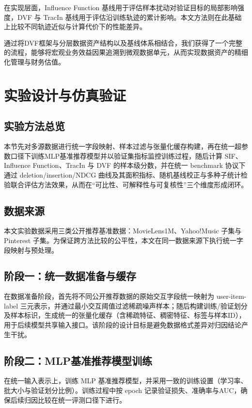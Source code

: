 \documentclass[12pt,a4paper]{ctexart}
\theoremstyle{definition}
\theoremstyle{plain}
\begin{document}
在实现层面，Influence Function 基线用于评估样本扰动对验证目标的局部影响强度，DVF 与 TracIn 基线用于评估沿训练轨迹的累计影响。本文方法则在此基础上比较不同轨迹近似与计算代价下的性能差异。

通过将DVF框架与分层数据资产结构以及基线体系相结合，我们获得了一个完整的流程，能够将宏观业务效益因果追溯到微观数据单元，从而实现数据资产的精细化管理与财务估值。

\section{实验设计与仿真验证}
\label{sec:experiment}
\subsection{实验方法总览}
本节先对多源数据进行统一字段映射、样本过滤与张量化缓存构建，再在统一超参数口径下训练MLP基准推荐模型并以验证集指标监控训练过程，随后计算 SIF、Influence Function、TracIn 与 DVF 的样本级分数，并在统一 benchmark 协议下通过 deletion/insertion/NDCG 曲线及其面积指标、随机基线校正与多种子统计检验联合评估方法效果，从而在“可比性、可解释性与可复核性”三个维度形成闭环。

\subsection{数据来源}
本文实验数据采用三类公开推荐基准数据：MovieLens1M、Yahoo!Music 子集与 Pinterest 子集。为保证跨方法比较的公平性，本文在同一数据来源下执行统一字段映射与预处理。

\subsection{阶段一：统一数据准备与缓存}
在数据准备阶段，首先将不同公开推荐数据的原始交互字段统一映射为 user-item-label 三元表示，并通过最小交互阈值过滤稀疏噪声样本；随后构建训练/验证划分及样本标识，生成统一的张量化缓存（含稀疏特征、稠密特征、标签与样本ID），用于后续模型共享输入接口。该阶段的设计目标是避免数据格式差异对归因结论产生干扰。

\subsection{阶段二：MLP基准推荐模型训练}
在统一输入表示上，训练 MLP 基准推荐模型，并采用一致的训练设置（学习率、批大小与验证划分比例）。训练过程中按 epoch 记录验证损失、准确率与AUC，确保后续归因比较在统一评测口径下进行。
\end{document}
